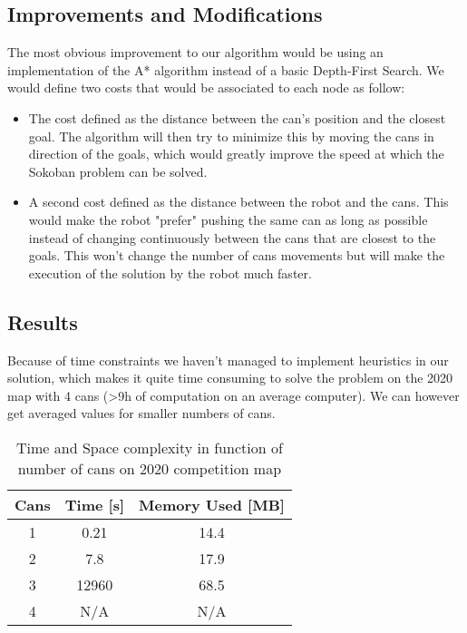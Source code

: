 \documentclass[a4paper,12pt]{article}
\begin{document}
\subsection{Improvements and Modifications}
The most obvious improvement to our algorithm would be using an implementation of the A* algorithm instead of a basic Depth-First Search. We would define two costs that would be associated to each node as follow:
\begin{itemize}
    \item The cost defined as the distance between the can's position and the closest goal. The algorithm will then try to minimize this by moving the cans in direction of the goals, which would greatly improve the speed at which the Sokoban problem can be solved.
    \item A second cost defined as the distance between the robot and the cans. This would make the robot "prefer" pushing the same can as long as possible instead of changing continuously between the cans that are closest to the goals. This won't change the number of cans movements but will make the execution of the solution by the robot much faster.
\end{itemize}
\pagebreak[4]

\subsection{Results}
Because of time constraints we haven't managed to implement heuristics in our solution, which makes it quite time consuming to solve the problem on the 2020 map with 4 cans (>9h of computation on an average computer). We can however get averaged values for smaller numbers of cans.

\begin{table}[h!]
\centering
\begin{tabular}{|c|c|c|}
 \hline
Cans & Time [s] & Memory Used [MB]\\ [0.5ex]
 \hline\hline
 1 & 0.21 & 14.4 \\
 2 & 7.8 & 17.9 \\
 3 & 12960 & 68.5 \\
 4 & N/A & N/A \\[1ex]
 \hline
\end{tabular}
\caption{Time and Space complexity in function of number of cans on 2020 competition map}
\label{table:timeSpaceCompl}
\end{table}
\end{document}
